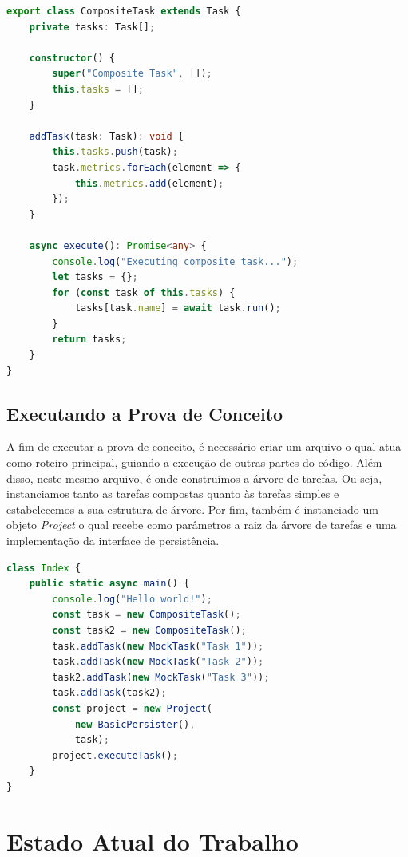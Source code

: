 \documentclass[12pt]{tcc}
\begin{document}
\begin{lstlisting}[label={lst:composite_task}, caption={Tarefa composta, define o comportamento de todos os nós não folha da árvore de tarefas.}, language=TypeScript]
export class CompositeTask extends Task {
    private tasks: Task[];

    constructor() {
        super("Composite Task", []);
        this.tasks = [];
    }

    addTask(task: Task): void {
        this.tasks.push(task);
        task.metrics.forEach(element => {
            this.metrics.add(element);
        });
    }

    async execute(): Promise<any> {
        console.log("Executing composite task...");
        let tasks = {};
        for (const task of this.tasks) {
            tasks[task.name] = await task.run();
        }
        return tasks;
    }
}
\end{lstlisting}


\section{Executando a Prova de Conceito}
\label{sec:exe_poc}
A fim de executar a prova de conceito, é necessário criar um arquivo o qual atua como roteiro principal, guiando a execução de outras partes do código.
Além disso, neste mesmo arquivo, é onde construímos a árvore de tarefas.
Ou seja, instanciamos tanto as tarefas compostas quanto às tarefas simples e estabelecemos a sua estrutura de árvore.
Por fim, também é instanciado um objeto \emph{Project} o qual recebe como parâmetros a raiz da árvore de tarefas e uma implementação da interface de persistência.

\begin{lstlisting}[label={lst:index_ts}, caption={Exemplo de roteiro principal para executar a prova de conceito.}, language=TypeScript]
class Index {
    public static async main() {
        console.log("Hello world!");
        const task = new CompositeTask();
        const task2 = new CompositeTask();
        task.addTask(new MockTask("Task 1"));
        task.addTask(new MockTask("Task 2"));
        task2.addTask(new MockTask("Task 3"));
        task.addTask(task2);
        const project = new Project(
            new BasicPersister(),
            task);
        project.executeTask();
    }
}
\end{lstlisting}

\chapter{Estado Atual do Trabalho}
\label{cap:estado_atual}
\end{document}
